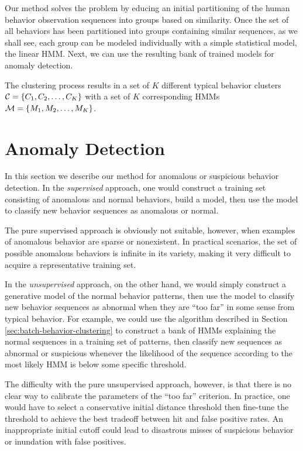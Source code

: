 Our method solves the problem by educing an initial partitioning of
the human behavior observation sequences into groups based on
similarity. Once the set of all behaviors has been partitioned into
groups containing similar sequences, as we shall see, each group can
be modeled individually with a simple statistical model, the linear
HMM. Next, we can use the resulting bank of trained models for anomaly
detection.

The clustering process results in a set of $K$ different typical
behavior clusters ${\cal C} = \{ C_1, C_2, \ldots, C_K \}$ with a set
of $K$ corresponding HMMs ${\cal M} = \{ M_1, M_2, \ldots, M_K \}$.

\section{Anomaly Detection}
\label{sec:batch-anomaly-detection}

In this section we describe our method for anomalous or suspicious
behavior detection. In the \textit{supervised} approach, one would
construct a training set consisting of anomalous and normal behaviors,
build a model, then use the model to classify new behavior sequences
as anomalous or normal.

The pure supervised approach is obviously not suitable, however, when
examples of anomalous behavior are sparse or nonexistent.  In
practical scenarios, the set of possible anomalous behaviors is
infinite in its variety, making it very difficult to acquire a
representative training set.

In the \textit{unsupervised} approach, on the other hand, we would
simply construct a generative model of the normal behavior patterns,
then use the model to classify new behavior sequences as abnormal when
they are ``too far'' in some sense from typical behavior.  For
example, we could use the algorithm described in
Section \ref{sec:batch-behavior-clustering} to construct a bank of
HMMs explaining the normal sequences in a training set of patterns,
then classify new sequences as abnormal or suspicious whenever the
likelihood of the sequence according to the most likely HMM is below
some specific threshold.

The difficulty with the pure unsupervised approach, however, is that
there is no clear way to calibrate the parameters of the ``too far''
criterion.  In practice, one would have to select a conservative
initial distance threshold then fine-tune the threshold to achieve the
best tradeoff between hit and false positive rates.  An inappropriate
initial cutoff could lead to disastrous misses of suspicious behavior
or inundation with false positives.

